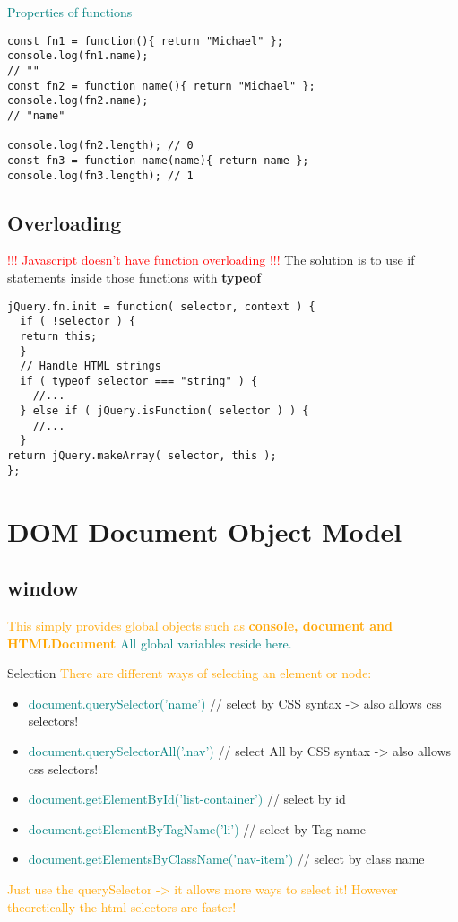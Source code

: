 \documentclass[main.tex,fontsize=6pt,paper=a4,paper=landscape,DIV=calc,]{scrartcl}
\begin{document}
\begin{multicols*}{4}
  \textcolor{teal}{Properties of functions}
\vspace{-2mm}
\begin{lstlisting}
const fn1 = function(){ return "Michael" };
console.log(fn1.name);
// ""
const fn2 = function name(){ return "Michael" };
console.log(fn2.name);
// "name"

console.log(fn2.length); // 0
const fn3 = function name(name){ return name };
console.log(fn3.length); // 1
\end{lstlisting}
\vspace{2mm}

\subsection{Overloading}
 \textcolor{red}{!!! Javascript doesn't have function overloading !!!}\newline
 The solution is to use if statements inside those functions with \textbf{typeof}
\vspace{-2mm}
\begin{lstlisting}
jQuery.fn.init = function( selector, context ) {
  if ( !selector ) {
  return this;
  }
  // Handle HTML strings
  if ( typeof selector === "string" ) {
    //...
  } else if ( jQuery.isFunction( selector ) ) {
    //...
  }
return jQuery.makeArray( selector, this );
};
\end{lstlisting}
\vspace{2mm}

\section{DOM Document Object Model}

\subsection{window}  
\textcolor{orange}{This simply provides global objects such as \textbf{console, document and HTMLDocument}}\newline
\textcolor{teal}{All global variables reside here.}

Selection 
\textcolor{orange}{There are different ways of selecting an element or node:}
\begin{itemize}
  \item \textcolor{teal}{document.querySelector('name')} // select by CSS syntax -> also allows css selectors!
  \item \textcolor{teal}{document.querySelectorAll('.nav')} // select All by CSS syntax -> also allows css selectors!
  \item \textcolor{teal}{document.getElementById('list-container')} // select by id
  \item \textcolor{teal}{document.getElementByTagName('li')} // select by Tag name
  \item \textcolor{teal}{document.getElementsByClassName('nav-item')} // select by class name
\end{itemize}
\textcolor{orange}{Just use the querySelector -> it allows more ways to select it! \newline
However theoretically the html selectors are faster!}


\end{multicols*}
\end{document}

